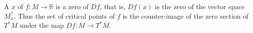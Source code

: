 A  $x$ of $f: M \to \mathbb{R}$ is a zero of $Df$, that is, $Df(x)$ is the zero of the vector space $M_x^*$. Thus the set of critical points of $f$ is the counter-image of the zero section of $T^*M$ under the map $Df: M \to T^*M$.
